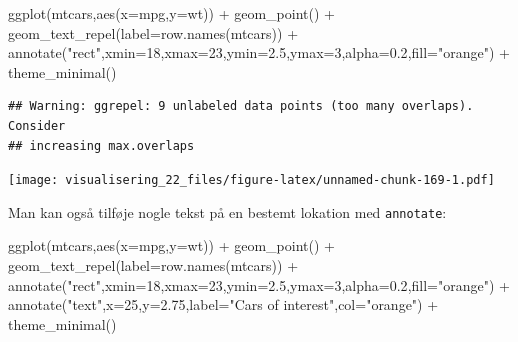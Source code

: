 \documentclass[
]{book}
\newenvironment{Shaded}{\begin{snugshade}}{\end{snugshade}}
\newcommand{\AttributeTok}[1]{\textcolor[rgb]{0.77,0.63,0.00}{#1}}
\newcommand{\DecValTok}[1]{\textcolor[rgb]{0.00,0.00,0.81}{#1}}
\newcommand{\FloatTok}[1]{\textcolor[rgb]{0.00,0.00,0.81}{#1}}
\newcommand{\FunctionTok}[1]{\textcolor[rgb]{0.00,0.00,0.00}{#1}}
\newcommand{\NormalTok}[1]{#1}
\newcommand{\SpecialCharTok}[1]{\textcolor[rgb]{0.00,0.00,0.00}{#1}}
\newcommand{\StringTok}[1]{\textcolor[rgb]{0.31,0.60,0.02}{#1}}
\begin{document}
\begin{Shaded}
\begin{Highlighting}[]
\FunctionTok{ggplot}\NormalTok{(mtcars,}\FunctionTok{aes}\NormalTok{(}\AttributeTok{x=}\NormalTok{mpg,}\AttributeTok{y=}\NormalTok{wt)) }\SpecialCharTok{+} 
  \FunctionTok{geom\_point}\NormalTok{() }\SpecialCharTok{+}
  \FunctionTok{geom\_text\_repel}\NormalTok{(}\AttributeTok{label=}\FunctionTok{row.names}\NormalTok{(mtcars)) }\SpecialCharTok{+}
  \FunctionTok{annotate}\NormalTok{(}\StringTok{"rect"}\NormalTok{,}\AttributeTok{xmin=}\DecValTok{18}\NormalTok{,}\AttributeTok{xmax=}\DecValTok{23}\NormalTok{,}\AttributeTok{ymin=}\FloatTok{2.5}\NormalTok{,}\AttributeTok{ymax=}\DecValTok{3}\NormalTok{,}\AttributeTok{alpha=}\FloatTok{0.2}\NormalTok{,}\AttributeTok{fill=}\StringTok{"orange"}\NormalTok{) }\SpecialCharTok{+}
  \FunctionTok{theme\_minimal}\NormalTok{()}
\end{Highlighting}
\end{Shaded}

\begin{verbatim}
## Warning: ggrepel: 9 unlabeled data points (too many overlaps). Consider
## increasing max.overlaps
\end{verbatim}

\texttt{[image: visualisering\_22\_files/figure-latex/unnamed-chunk-169-1.pdf]}

Man kan også tilføje nogle tekst på en bestemt lokation med \texttt{annotate}:

\begin{Shaded}
\begin{Highlighting}[]
\FunctionTok{ggplot}\NormalTok{(mtcars,}\FunctionTok{aes}\NormalTok{(}\AttributeTok{x=}\NormalTok{mpg,}\AttributeTok{y=}\NormalTok{wt)) }\SpecialCharTok{+} 
  \FunctionTok{geom\_point}\NormalTok{() }\SpecialCharTok{+}
  \FunctionTok{geom\_text\_repel}\NormalTok{(}\AttributeTok{label=}\FunctionTok{row.names}\NormalTok{(mtcars)) }\SpecialCharTok{+}
  \FunctionTok{annotate}\NormalTok{(}\StringTok{"rect"}\NormalTok{,}\AttributeTok{xmin=}\DecValTok{18}\NormalTok{,}\AttributeTok{xmax=}\DecValTok{23}\NormalTok{,}\AttributeTok{ymin=}\FloatTok{2.5}\NormalTok{,}\AttributeTok{ymax=}\DecValTok{3}\NormalTok{,}\AttributeTok{alpha=}\FloatTok{0.2}\NormalTok{,}\AttributeTok{fill=}\StringTok{"orange"}\NormalTok{) }\SpecialCharTok{+}
  \FunctionTok{annotate}\NormalTok{(}\StringTok{"text"}\NormalTok{,}\AttributeTok{x=}\DecValTok{25}\NormalTok{,}\AttributeTok{y=}\FloatTok{2.75}\NormalTok{,}\AttributeTok{label=}\StringTok{"Cars of interest"}\NormalTok{,}\AttributeTok{col=}\StringTok{"orange"}\NormalTok{) }\SpecialCharTok{+} 
  \FunctionTok{theme\_minimal}\NormalTok{()}
\end{Highlighting}
\end{Shaded}
\end{document}
